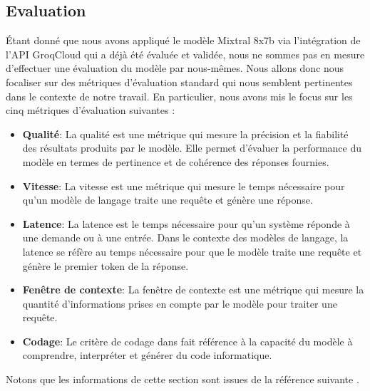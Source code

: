 \subsection{Evaluation}
Étant donné que nous avons appliqué le modèle Mixtral 8x7b via l'intégration de l'API GroqCloud qui a déjà été évaluée et validée, nous ne sommes pas en mesure d'effectuer une évaluation du modèle par nous-mêmes. Nous allons donc nous focaliser sur des métriques d'évaluation standard qui nous semblent pertinentes dans le contexte de notre travail. En particulier, nous avons mis le focus sur les cinq métriques d'évaluation suivantes :
\begin{itemize}
    \item \textbf{Qualité}: La qualité est une métrique qui mesure la précision et la fiabilité des résultats produits par le modèle. Elle permet d'évaluer la performance du modèle en termes de pertinence et de cohérence des réponses fournies.
    \item \textbf{Vitesse}: La vitesse est une métrique qui mesure le temps nécessaire pour qu'un modèle de langage traite une requête et génère une réponse.
    \item \textbf{Latence}: La latence est le temps nécessaire pour qu'un système réponde à une demande ou à une entrée. Dans le contexte des modèles de langage, la latence se réfère au temps nécessaire pour que le modèle traite une requête et génère le premier token de la réponse.
    \item \textbf{Fenêtre de contexte}: La fenêtre de contexte est une métrique qui mesure la quantité d'informations prises en compte par le modèle pour traiter une requête.
    \item \textbf{Codage}: Le critère de codage dans fait référence à la capacité du modèle à comprendre, interpréter et générer du code informatique.
\end{itemize}
Notons que les informations de cette section sont issues de la référence suivante \cite{mixtral8x7b}.

